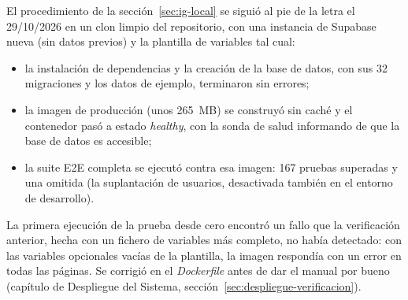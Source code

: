 El procedimiento de la sección~\ref{sec:ig-local} se siguió al pie de la
letra el 29/10/2026 en un clon limpio del repositorio, con una instancia de
Supabase nueva (sin datos previos) y la plantilla de variables tal cual:

\begin{itemize}
  \item la instalación de dependencias y la creación de la base de datos, con
        sus 32 migraciones y los datos de ejemplo, terminaron sin errores;
  \item la imagen de producción (unos 265~MB) se construyó sin caché y el
        contenedor pasó a estado \textit{healthy}, con la sonda de salud
        informando de que la base de datos es accesible;
  \item la suite E2E completa se ejecutó contra esa imagen: 167 pruebas
        superadas y una omitida (la suplantación de usuarios, desactivada
        también en el entorno de desarrollo).
\end{itemize}

La primera ejecución de la prueba desde cero encontró un fallo que la
verificación anterior, hecha con un fichero de variables más completo, no
había detectado: con las variables opcionales vacías de la plantilla, la
imagen respondía con un error en todas las páginas. Se corrigió en el
\textit{Dockerfile} antes de dar el manual por bueno (capítulo de Despliegue
del Sistema, sección~\ref{sec:despliegue-verificacion}).

\fussy
